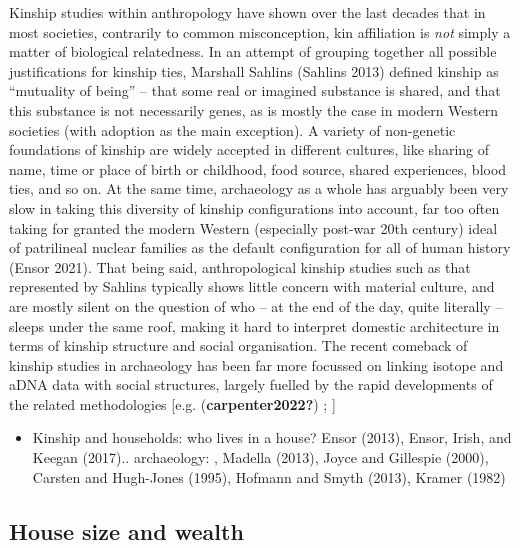 \documentclass[
  12pt,
]{book}
\providecommand{\tightlist}{%
  \setlength{\itemsep}{0pt}\setlength{\parskip}{0pt}}
\begin{document}
Kinship studies within anthropology have shown over the last decades that in most societies, contrarily to common misconception, kin affiliation is \emph{not} simply a matter of biological relatedness. In an attempt of grouping together all possible justifications for kinship ties, Marshall Sahlins (Sahlins 2013) defined kinship as ``mutuality of being'' -- that some real or imagined substance is shared, and that this substance is not necessarily genes, as is mostly the case in modern Western societies (with adoption as the main exception). A variety of non-genetic foundations of kinship are widely accepted in different cultures, like sharing of name, time or place of birth or childhood, food source, shared experiences, blood ties, and so on. At the same time, archaeology as a whole has arguably been very slow in taking this diversity of kinship configurations into account, far too often taking for granted the modern Western (especially post-war 20th century) ideal of patrilineal nuclear families as the default configuration for all of human history (Ensor 2021). That being said, anthropological kinship studies such as that represented by Sahlins typically shows little concern with material culture, and are mostly silent on the question of who -- at the end of the day, quite literally -- sleeps under the same roof, making it hard to interpret domestic architecture in terms of kinship structure and social organisation. The recent comeback of kinship studies in archaeology has been far more focussed on linking isotope and aDNA data with social structures, largely fuelled by the rapid developments of the related methodologies {[}e.g. (\textbf{carpenter2022?}) ; {]}

\begin{itemize}
\tightlist
\item
  Kinship and households: who lives in a house? Ensor (2013), Ensor, Irish, and Keegan (2017).. archaeology: , Madella (2013), Joyce and Gillespie (2000), Carsten and Hugh-Jones (1995), Hofmann and Smyth (2013), Kramer (1982)
\end{itemize}

\hypertarget{house-size-and-wealth}{%
\subsection{House size and wealth}\label{house-size-and-wealth}}
\end{document}
